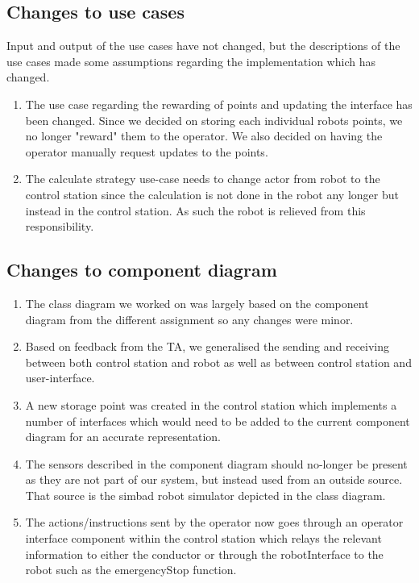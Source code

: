 \subsection{Changes to use cases}
Input and output of the use cases have not changed, but the descriptions of the use cases made some assumptions regarding the implementation which has changed.
\begin{enumerate}
    \item The use case regarding the rewarding of points and updating the interface has been changed. Since we decided on storing each individual robots points, we no longer "reward" them to the operator. We also decided on having the operator manually request updates to the points.
    \item The calculate strategy use-case needs to change actor from robot to the control station since the calculation is not done in the robot any longer but instead in the control station. As such the robot is relieved from this responsibility.
\end{enumerate}


\subsection{Changes to component diagram}
\begin{enumerate}
    \item The class diagram we worked on was largely based on the component diagram from the different assignment so any changes were minor.
    \item Based on feedback from the TA, we generalised the sending and receiving between both control station and robot as well as between control station and user-interface.
    \item A new storage point was created in the control station which implements a number of interfaces which would need to be added to the current component diagram for an accurate representation.
    \item The sensors described in the component diagram should no-longer be present as they are not part of our system, but instead used from an outside source. That source is the simbad robot simulator depicted in the class diagram.
    \item The actions/instructions sent by the operator now goes through an operator interface component within the control station which relays the relevant information to either the conductor or through the robotInterface to the robot such as the emergencyStop function.
\end{enumerate}


